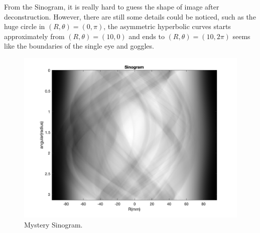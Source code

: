 \documentclass{report}
\begin{document}
From the Sinogram, it is really hard to guess the shape of image after deconstruction.
However, there are still some details could be noticed, such as the huge circle in 
$(R, \theta) = (0,\pi)$, the asymmetric hyperbolic curves starts approximately from 
$(R, \theta) = (10,0)$ and ends to $(R, \theta) = (10,2 \pi)$ seems like the boundaries
of the single eye and goggles.

\begin{figure}[hb]
    \centering
    \includegraphics[width=1\textwidth]{12.png}
    \caption{Mystery Sinogram.}
\end{figure}
\end{document}
